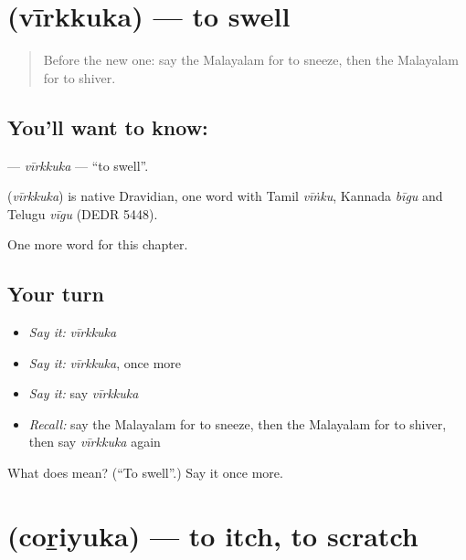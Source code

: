 \section[\texorpdfstring{\ml{വീർക്കുക} (vīrkkuka)}{വീർക്കുക (vīrkkuka)}]{ (vīrkkuka) — to swell}

\label{lesson:ML-C304-virkkuka}



\begin{quote}
Before the new one: say the Malayalam for to sneeze, then the Malayalam for to shiver.
\end{quote}

\subsection*{You'll want to know: }
\textbf{} — \emph{vīrkkuka} — \textquotedblleft{}to swell\textquotedblright{}.

\begin{cousinweb}
\textbf{} (\emph{vīrkkuka}) is native Dravidian, one word with Tamil \emph{vīṅku}, Kannada \emph{bīgu} and Telugu \emph{vīgu} (DEDR 5448).
\end{cousinweb}

\begin{grammarlens}[title={What you've built}]
One more word for this chapter.
\end{grammarlens}

\subsection*{Your turn}
\begin{itemize}
\raggedright
  \item \emph{Say it:} \emph{vīrkkuka}
  \item \emph{Say it:} \emph{vīrkkuka}, once more
  \item \emph{Say it:} say \emph{vīrkkuka}
  \item \emph{Recall:} say the Malayalam for to sneeze, then the Malayalam for to shiver, then say \emph{vīrkkuka} again
\end{itemize}

\begin{tcolorbox}[breakable,colback=teal!4,colframe=teal!35!black,title={Before you move on}]
What does  mean? (\textquotedblleft{}To swell\textquotedblright{}.) Say it once more.
\end{tcolorbox}
\section[\texorpdfstring{\ml{ചൊറിയുക} (coṟiyuka)}{ചൊറിയുക (coṟiyuka)}]{ (coṟiyuka) — to itch, to scratch}

